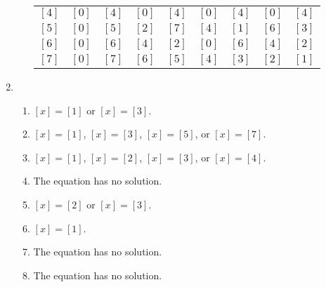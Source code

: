 \begin{enumerate}
\begin{enumerate}
\begin{tabular}{ c | c  c  c  c  c  c  c c}
$\left[ 4 \right]$ & $\left[ 0 \right]$ & $\left[ 4 \right]$ & $\left[ 0 \right]$ & 
$\left[ 4 \right]$ & $\left[ 0 \right]$ & $\left[ 4 \right]$ & $\left[ 0 \right]$ & 
$\left[ 4 \right]$  \\ 

$\left[ 5 \right]$ & $\left[ 0 \right]$ & $\left[ 5 \right]$ & $\left[ 2 \right]$ & 
$\left[ 7 \right]$ & $\left[ 4 \right]$ & $\left[ 1 \right]$ & $\left[ 6 \right]$ & 
$\left[ 3 \right]$  \\ 

$\left[ 6 \right]$ & $\left[ 0 \right]$ & $\left[ 6 \right]$ & $\left[ 4 \right]$ & 
$\left[ 2 \right]$ & $\left[ 0 \right]$ & $\left[ 6 \right]$ & $\left[ 4 \right]$ & 
$\left[ 2 \right]$  \\ 

$\left[ 7 \right]$ & $\left[ 0 \right]$ & $\left[ 7 \right]$ & $\left[ 6 \right]$ & 
$\left[ 5 \right]$ & $\left[ 4 \right]$ & $\left[ 3 \right]$ & $\left[ 2 \right]$ & 
$\left[ 1 \right]$  \\ 
\end{tabular}
\end{enumerate}




\item \begin{enumerate}
\item $\left[ x \right] = \left[ 1 \right]$ or $\left[ x \right] = \left[ 3 \right]$. 

\item $\left[ x \right] = \left[ 1 \right]$, $\left[ x \right] = \left[ 3 \right]$, 
$\left[ x \right] = \left[ 5 \right]$, or $\left[ x \right] = \left[ 7 \right]$.

\item $\left[ x \right] = \left[ 1 \right]$, $\left[ x \right] = \left[ 2 \right]$, 
$\left[ x \right] = \left[ 3 \right]$, or $\left[ x \right] = \left[ 4 \right]$.

\item The equation has no solution.

\item $\left[ x \right] = \left[ 2 \right]$ or $\left[ x \right] = \left[ 3 \right]$.

\item $\left[ x \right] = \left[ 1 \right]$.

\item The equation has no solution.

\item The equation has no solution.
\end{enumerate}




\end{enumerate}
